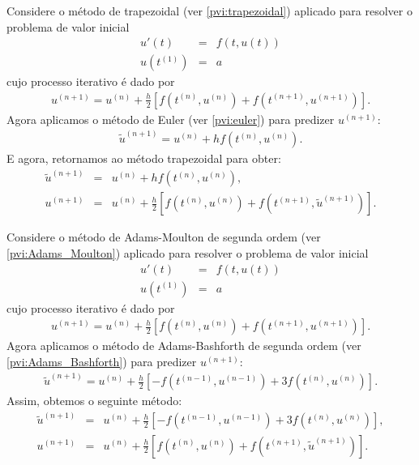 \begin{ex} Considere o método de trapezoidal (ver \ref{pvi:trapezoidal}) aplicado para resolver o problema de valor inicial
\begin{eqnarray*}
  u'(t)  &=& f(t,u(t)) \\
  u(t^{(1)}) &=& a
\end{eqnarray*}
cujo processo iterativo é dado por
\begin{eqnarray*}
u^{(n+1)}=u^{(n)} + \frac{h}{2} \left[f(t^{(n)},u^{(n)})+f(t^{(n+1)},u^{(n+1)})\right].
\end{eqnarray*}
Agora aplicamos o método de Euler (ver \ref{pvi:euler}) para predizer $u^{(n+1)}$:
\begin{eqnarray*}
\tilde{u}^{(n+1)}=u^{(n)} + h f(t^{(n)},u^{(n)}).
\end{eqnarray*}
E agora, retornamos ao método trapezoidal para obter:
\begin{eqnarray*}
\tilde{u}^{(n+1)}&=&u^{(n)} + h f(t^{(n)},u^{(n)}),\\
u^{(n+1)}&=&u^{(n)} + \frac{h}{2} \left[f(t^{(n)},u^{(n)})+f(t^{(n+1)},\tilde{u}^{(n+1)})\right].
\end{eqnarray*}
\end{ex}

\begin{ex} Considere o método de Adams-Moulton de segunda ordem (ver \ref{pvi:Adams_Moulton}) aplicado para resolver  o problema de valor inicial
\begin{eqnarray*}
  u'(t)  &=& f(t,u(t)) \\
  u(t^{(1)}) &=& a
\end{eqnarray*}
cujo processo iterativo é dado por
\begin{eqnarray*}
u^{(n+1)}=u^{(n)} + \frac{h}{2} \left[f(t^{(n)},u^{(n)})+f(t^{(n+1)},u^{(n+1)})\right].
\end{eqnarray*}
Agora aplicamos o método de Adams-Bashforth de segunda ordem (ver \ref{pvi:Adams_Bashforth}) para predizer $u^{(n+1)}$:
\begin{eqnarray*}
\tilde{u}^{(n+1)}=u^{(n)} + \frac{h}{2} \left[-f(t^{(n-1)},u^{(n-1)})+3f(t^{(n)},u^{(n)})\right].
\end{eqnarray*}
Assim, obtemos o seguinte método:
\begin{eqnarray*}
\tilde{u}^{(n+1)}&=&u^{(n)} + \frac{h}{2} \left[-f(t^{(n-1)},u^{(n-1)})+3f(t^{(n)},u^{(n)})\right],\\
u^{(n+1)}&=&u^{(n)} + \frac{h}{2} \left[f(t^{(n)},u^{(n)})+f(t^{(n+1)},\tilde{u}^{(n+1)})\right].
\end{eqnarray*}
\end{ex}

